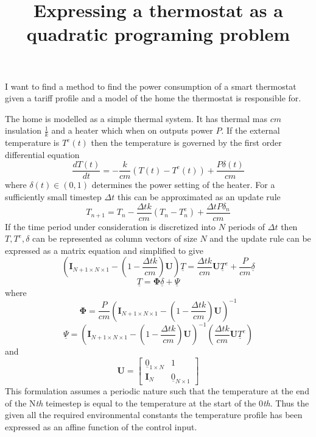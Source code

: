 \documentclass[11pt]{article}
\title{\textbf{Expressing a thermostat as a quadratic programing problem}}
\author{}
\date{}
\begin{document}
\maketitle

\section{}

I want to find a method to find the power consumption of a smart thermostat given a tariff profile and a model of the home the thermostat is responsible for.

The home is modelled as a simple thermal system. It has thermal mas $cm$ insulation $\frac{1}{k}$ and a heater which when on outputs power $P$. If the external temperature is $T^{e}(t)$ then the temperature is governed by the first order differential equation
\begin{equation}
\frac{dT(t)}{dt} = -\frac{k}{cm}(T(t)-T^{e}(t)) +\frac{P\delta(t)}{cm}
\end{equation}
where $\delta(t) \in (0,1)$ determines the power setting of the heater. For a sufficiently small timestep $\Delta t$  this can be approximated as an update rule
\begin{equation}
T_{n+1} =  T_{n}-\frac{\Delta t k}{cm}(T_{n}-T_{n}^{e}) + \frac{\Delta t P \delta_{n}}{cm} 
\end{equation}
If the time period under consideration is discretized into $N$ periods of $\Delta t$ then $T, T^{e},\delta$ can be represented as column vectors of size $N$ and the update rule can be expressed as a matrix equation and simplified to give
\begin{equation}
\left( \mathbf{I}_{N+1 \times N \times 1}-(1-\frac{\Delta t k}{cm})\mathbf{U}\right) \underline{T} = \frac{\Delta t k}{cm}\mathbf{U}\underline{T}^{e}+\frac{P}{cm}\underline{\delta}
\end{equation}
\begin{equation}
\underline{T}=\mathbf{\Phi} \underline{\delta}+\underline{\Psi}
\end{equation}
where
\begin{equation}
\mathbf{\Phi}= \frac{P}{cm} \left( \mathbf{I}_{N+1 \times N \times 1}-(1-\frac{\Delta t k}{cm})\mathbf{U}\right)^{-1}
\end{equation}
\begin{equation}
\underline{\Psi}= \left( \mathbf{I}_{N+1 \times N \times 1}-(1-\frac{\Delta t k}{cm})\mathbf{U}\right)^{-1} \left( \frac{\Delta t k}{cm}\mathbf{U}\underline{T}^{e}\right)
\end{equation}
and
\begin{equation}
\mathbf{U} = \left[
\begin{array}{c|c}
\underline{0}_{1\times N} & 1 \\ \hline
\mathbf{I}_{N} & \underline{0}_{N \times 1}
\end{array}\right]
\end{equation}
This formulation assumes a periodic nature such that the temperature at the end of the N\textit{th} teimestep is equal to the temperature at the start of the 0\textit{th}.
Thus the given all the required environmental constants the temperature profile has been expressed as an affine function of the control input.
\end{document}
